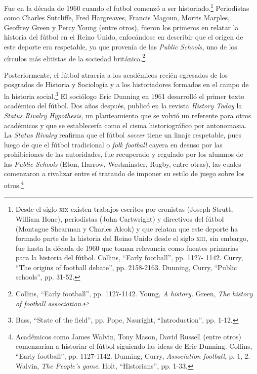 \documentclass[11pt,a5paper,twoside]{book} %
\begin{document}
Fue en la década de 1960 cuando el futbol comenzó a ser historiado.\footnote{Desde el siglo \textsc{xix} existen trabajos escritos por cronistas (Joseph Strutt, William Hone), periodistas (John Cartwright) y directivos del fútbol (Montague Shearman y Charles Alcok) y que relatan que este deporte ha formado parte de la historia del Reino Unido desde el siglo \textsc{xiii}, sin embargo, fue hasta la década de 1960 que toman relevancia como fuentes primarias para la historia del fútbol. Collins, ``Early football'', pp. 1127- 1142. Curry, ``The origins of football debate'', pp. 2158-2163. Dunning, Curry, ``Public schools'', pp. 31-52.} Periodistas
como Charles Sutcliffe, Fred Hargreaves, Francis Magoun, Morris Marples, Geoffrey Green
y Percy Young (entre otros), fueron los primeros en relatar la historia del fútbol en el Reino
Unido, enfocándose en describir que el origen de este deporte era respetable, ya que provenía
de las \emph{Public Schools}, uno de los círculos más elitistas de la sociedad británica.\footnote{Collins, ``Early football'', pp. 1127-1142. Young, \emph{A history.} Green, \emph{The history of football association.}}

Posteriormente, el fútbol atraería a los académicos recién egresados de los posgrados
de Historia y Sociología y a los historiadores formados en el campo de la historia social.\footnote{Bass, ``State of the field'', pp. Pope, Nauright, ``Introduction'', pp. 1-12.} El
sociólogo Eric Dunning en 1961 desarrolló el primer texto académico del fútbol. Dos años
después, publicó en la revista \emph{History Today} la \emph{Status Rivalry Hypothesis}, un planteamiento
que se volvió un referente para otros académicos y que se establecería como el cisma
historiográfico por antonomasia. La \emph{Status Rivalry} reafirma que el fútbol \emph{soccer} tiene un linaje respetable, pues luego de que el fútbol tradicional o \emph{folk football} cayera en desuso por
las prohibiciones de las autoridades, fue recuperado y regulado por los alumnos de las \emph{Public
Schools} (Eton, Harrow, Westminster, Rugby, entre otras), las cuales comenzaron a rivalizar
entre sí tratando de imponer su estilo de juego sobre los otros.\footnote{Académicos como James Walvin, Tony Mason, David Russell (entre otros) comenzarían a historiar el fútbol siguiendo las ideas de Eric Dunning. Collins, ``Early football'', pp. 1127-1142. Dunning, Curry, \emph{Association football}, p. 1, 2. Walvin, \emph{The People's game}. Holt, ``Historians'', pp. 1-33.}
\end{document}
